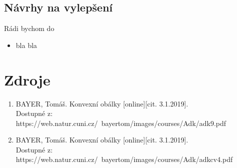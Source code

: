 \documentclass[a4paper, 12pt]{article}
\begin{document}
\subsection{Návrhy na vylepšení}
Rádi bychom do
\begin{itemize}
\item bla bla
\end{itemize}

\clearpage
\section{Zdroje}

\begin{enumerate}
\item  BAYER, Tomáš. Konvexní obálky [online][cit. 3.1.2019]. \\
Dostupné z: https://web.natur.cuni.cz/~bayertom/images/courses/Adk/adk9.pdf  \\

\item  BAYER, Tomáš. Konvexní obálky [online][cit. 3.1.2019]. \\
Dostupné z: https://web.natur.cuni.cz/~bayertom/images/courses/Adk/adkcv4.pdf\\
\end{enumerate}
\end{document}
